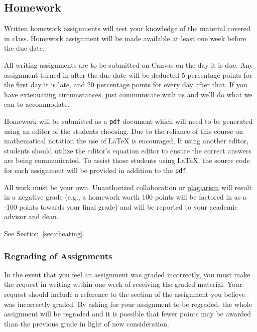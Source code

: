 \documentclass[12pt]{scrartcl}
\begin{document}
\subsection{Homework}

Written homework assignments will test your knowledge of the material covered in class. 
Homework assignment will be made available at least one week before the due date.

All writing assignments are to be submitted on Canvas on the day it is due.  
Any assignment turned in after the due date will be deducted 5 percentage points for the first day it is late, 
and 20 percentage points for every day after that.
If you have extenuating circumstances, just communicate with us and we'll do what we can to accommodate.  

Homework will be submitted as a \texttt{pdf} document which will need to be generated using an editor of the students choosing. 
Due to the reliance of this course on mathematical notation the use of \LaTeX{} is encouraged, 
If using another editor, students should utilize the editor's equation editor to ensure the correct answers are being communicated. 
To assist those students using \LaTeX, the source code for each assignment will be provided in addition to the \texttt{pdf}.

\begin{tcolorbox}[colback=red!5,colframe=red!75!black,title=Cheating policy]
All work must be your own. Unauthorized collaboration or \href{https://www.cmu.edu/student-affairs/ocsi/}{plagiarism} will result in a negative grade (e.g., a homework worth 100 points will be factored in as a -100 points towards your final grade) and will be reported to your academic advisor and dean.

\vspace{1em}
See Section~\ref{sec:cheating}.
\end{tcolorbox}

\subsubsection{Regrading of Assignments}
In the event that you feel an assignment was graded incorrectly, 
you must make the request in writing within one week of receiving the graded material.  
Your request should include a reference to the section of the assignment you believe was incorrectly graded.   
By asking for your assignment to be regraded, 
the whole assignment will be regraded and it is possible that fewer points 
may be awarded than the previous grade in light of new consideration.
\end{document}
